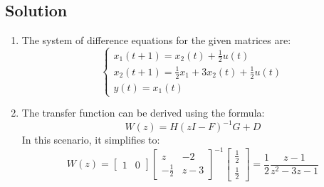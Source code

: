 \subsection*{Solution}
\begin{enumerate}
    \item The system of difference equations for the given matrices are:
        \[\begin{cases}
            x_1(t+1)=x_2(t)+\frac{1}{2}u(t) \\
            x_2(t+1)=\frac{1}{2}x_1+3x_2(t)+\frac{1}{2}u(t) \\
            y(t)=x_1(t)
        \end{cases}\]
    \item The transfer function can be derived using the formula:
        \[W(z)=H\left(zI-F\right)^{-1}G+D\]
        In this scenario, it simplifies to:
        \[W(z)=\begin{bmatrix} 1 & 0 \end{bmatrix}\begin{bmatrix} z & -2 \\ -\frac{1}{2} & z-3 \end{bmatrix}^{-1}\begin{bmatrix} \frac{1}{2} \\ \frac{1}{2} \end{bmatrix}=\dfrac{1}{2}\dfrac{z-1}{z^{2}-3z-1}\]


\end{enumerate}

